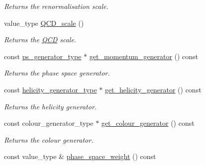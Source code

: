 \begin{DoxyCompactItemize}
\begin{DoxyCompactList}\small\item\em Returns the renormalisation scale. \end{DoxyCompactList}\item 
\hypertarget{a00430_a58d8c637591672f8355c333d774606fc}{value\-\_\-type \hyperlink{a00430_a58d8c637591672f8355c333d774606fc}{Q\-C\-D\-\_\-scale} ()}\label{a00430_a58d8c637591672f8355c333d774606fc}

\begin{DoxyCompactList}\small\item\em Returns the \hyperlink{a00449}{Q\-C\-D} scale. \end{DoxyCompactList}\item 
\hypertarget{a00430_aa00ae8fc9b174806a29447b0416216a4}{const \hyperlink{a00441}{ps\-\_\-generator\-\_\-type} $\ast$ \hyperlink{a00430_aa00ae8fc9b174806a29447b0416216a4}{get\-\_\-momentum\-\_\-generator} () const }\label{a00430_aa00ae8fc9b174806a29447b0416216a4}

\begin{DoxyCompactList}\small\item\em Returns the phase space generator. \end{DoxyCompactList}\item 
\hypertarget{a00430_ad86eef948e9057c2483c84494be6bfb0}{const \hyperlink{a00266}{helicity\-\_\-generator\-\_\-type} $\ast$ \hyperlink{a00430_ad86eef948e9057c2483c84494be6bfb0}{get\-\_\-helicity\-\_\-generator} () const }\label{a00430_ad86eef948e9057c2483c84494be6bfb0}

\begin{DoxyCompactList}\small\item\em Returns the helicity generator. \end{DoxyCompactList}\item 
\hypertarget{a00430_a864a7a868bda19ea34cb42751fd716ca}{const colour\-\_\-generator\-\_\-type $\ast$ \hyperlink{a00430_a864a7a868bda19ea34cb42751fd716ca}{get\-\_\-colour\-\_\-generator} () const }\label{a00430_a864a7a868bda19ea34cb42751fd716ca}

\begin{DoxyCompactList}\small\item\em Returns the colour generator. \end{DoxyCompactList}\item 
\hypertarget{a00430_a39fb72cd0e8adca6c6a923a21a64c3c8}{const value\-\_\-type \& \hyperlink{a00430_a39fb72cd0e8adca6c6a923a21a64c3c8}{phase\-\_\-space\-\_\-weight} () const }\label{a00430_a39fb72cd0e8adca6c6a923a21a64c3c8}


\end{DoxyCompactItemize}
